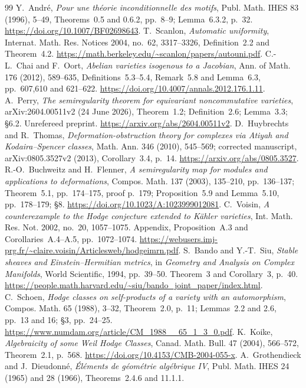 \begin{thebibliography}{99}
 Y.~Andr\'e, \emph{Pour une th\'eorie inconditionnelle des motifs}, Publ. Math. IHES 83 (1996), 5--49, Theorems~0.5 and 0.6.2, pp.~8--9; Lemma~6.3.2, p.~32. \url{https://doi.org/10.1007/BF02698643}.
 T.~Scanlon, \emph{Automatic uniformity}, Internat. Math. Res. Notices 2004, no.~62, 3317--3326, Definition~2.2 and Theorem~4.2. \url{https://math.berkeley.edu/~scanlon/papers/autouni.pdf}.
 C.-L.~Chai and F.~Oort, \emph{Abelian varieties isogenous to a Jacobian}, Ann. of Math. 176 (2012), 589--635, Definitions~5.3--5.4, Remark~5.8 and Lemma~6.3, pp.~607,610 and 621--622. \url{https://doi.org/10.4007/annals.2012.176.1.11}.
 A.~Perry, \emph{The semiregularity theorem for equivariant noncommutative varieties}, arXiv:2604.00511v2 (24 June 2026), Theorem~1.2; Definition~2.6; Lemma~3.3; \S6.2. Unrefereed preprint. \url{https://arxiv.org/abs/2604.00511v2}.
 D.~Huybrechts and R.~Thomas, \emph{Deformation-obstruction theory for complexes via Atiyah and Kodaira--Spencer classes}, Math. Ann. 346 (2010), 545--569; corrected manuscript, arXiv:0805.3527v2 (2013), Corollary~3.4, p.~14. \url{https://arxiv.org/abs/0805.3527}.
 R.-O.~Buchweitz and H.~Flenner, \emph{A semiregularity map for modules and applications to deformations}, Compos. Math. 137 (2003), 135--210, pp.~136--137; Theorem~5.1, pp.~174--175, proof p.~179; Proposition~5.9 and Lemma~5.10, pp.~178--179; \S8. \url{https://doi.org/10.1023/A:1023999012081}.
 C.~Voisin, \emph{A counterexample to the Hodge conjecture extended to Kähler varieties}, Int. Math. Res. Not. 2002, no.~20, 1057--1075. Appendix, Proposition~A.3 and Corollaries~A.4--A.5, pp.~1072--1074. \url{https://webusers.imj-prg.fr/~claire.voisin/Articlesweb/hodgeimrn.pdf}.
 S.~Bando and Y.-T.~Siu, \emph{Stable sheaves and Einstein--Hermitian metrics}, in \emph{Geometry and Analysis on Complex Manifolds}, World Scientific, 1994, pp.~39--50. Theorem~3 and Corollary~3, p.~40. \url{https://people.math.harvard.edu/~siu/bando_joint_paper/index.html}.
 C.~Schoen, \emph{Hodge classes on self-products of a variety with an automorphism}, Compos. Math. 65 (1988), 3--32, Theorem~2.0, p.~11; Lemmas~2.2 and 2.6, pp.~13 and 16; \S3, pp.~24--25. \url{https://www.numdam.org/article/CM_1988__65_1_3_0.pdf}.
 K.~Koike, \emph{Algebraicity of some Weil Hodge Classes}, Canad. Math. Bull. 47 (2004), 566--572, Theorem~2.1, p.~568. \url{https://doi.org/10.4153/CMB-2004-055-x}.
 A.~Grothendieck and J.~Dieudonn\'e, \emph{\'El\'ements de g\'eom\'etrie alg\'ebrique IV}, Publ. Math. IHES 24 (1965) and 28 (1966), Theorems~2.4.6 and 11.1.1.

\end{thebibliography}
